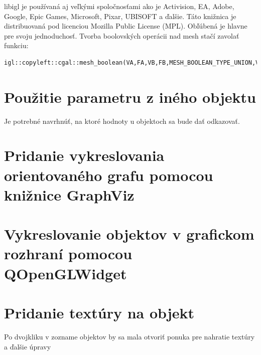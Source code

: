 libigl je používaná aj veľkými spoločnosťami ako je Activision, EA, Adobe, Google, Epic Games, Microsoft, Pixar, UBISOFT a ďalšie. Táto knižnica je distribuovaná pod licenciou Mozilla Public License (MPL).
Obľúbená je hlavne pre svoju jednoduchosť. Tvorba boolovských operácii nad mesh stačí zavolať funkciu: 

\begin{lstlisting}
igl::copyleft::cgal::mesh_boolean(VA,FA,VB,FB,MESH_BOOLEAN_TYPE_UNION,VC,FC);
\end{lstlisting}


\section{Použitie parametru z iného objektu}
Je potrebné navrhnúť, na ktoré hodnoty u objektoch sa bude dať odkazovať. 

\section{Pridanie vykreslovania orientovaného grafu pomocou knižnice GraphViz}


\section{Vykreslovanie objektov v grafickom rozhraní pomocou QOpenGLWidget}

\section{Pridanie textúry na objekt}
Po dvojkliku v zozname objektov by sa mala otvoriť ponuka pre nahratie textúry a ďalšie úpravy
